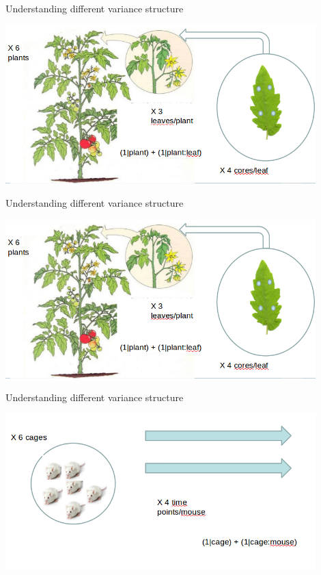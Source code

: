 \documentclass[10pt]{beamer}
\begin{document}
\begin{frame}{Understanding different variance structure}
 
 \begin{center}
  \includegraphics[width=0.9\textwidth]{Figures/nestedtomatoes}
 \end{center}

\end{frame}

\begin{frame}{Understanding different variance structure}
 
 \begin{center}
  \includegraphics[width=0.9\textwidth]{Figures/nestedtomatoes}
 \end{center}

\end{frame}


\begin{frame}{Understanding different variance structure}
 
 \begin{center}
  \includegraphics[width=0.9\textwidth]{Figures/nestedmice}
 \end{center}

\end{frame}
\end{document}
